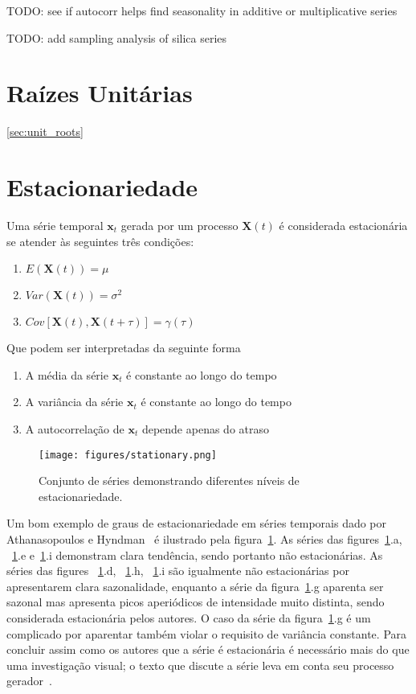 TODO: see if autocorr helps find seasonality in additive or multiplicative series

TODO: add sampling analysis of silica series


\section{Raízes Unitárias}\ref{sec:unit_roots}

\section{Estacionariedade}\label{sec:stationarity}

Uma série temporal $\mathbf{x}_t$ gerada por um processo $\mathbf{X}(t)$ é
considerada estacionária se atender às seguintes três condições:

\begin{enumerate}
    \item $E(\mathbf{X}(t)) = \mu$
    \item $Var(\mathbf{X}(t)) = \sigma^2$
    \item $Cov[\mathbf{X}(t), \mathbf{X}(t+\tau)] = \gamma(\tau)$
\end{enumerate}\vspace{.5cm}

Que podem ser interpretadas da seguinte forma

\begin{enumerate}
    \item A média da série $\mathbf{x}_t$ é constante ao longo do tempo
    \item A variância da série $\mathbf{x}_t$ é constante ao longo do tempo
    \item A autocorrelação de $\mathbf{x}_t$ depende apenas do atraso
\end{enumerate}\vspace{.5cm}

\begin{figure}[h]
    \centering
    \texttt{[image: figures/stationary.png]}
    \caption{Conjunto de séries demonstrando diferentes níveis de
    estacionariedade.}
    \label{fig:stationarity}
\end{figure}

Um bom exemplo de graus de estacionariedade em séries temporais dado por
Athanasopoulos e Hyndman~\cite{athana} é ilustrado pela
figura~\ref{fig:stationarity}. As séries das figures~\ref{fig:stationarity}.a,
~\ref{fig:stationarity}.e e~\ref{fig:stationarity}.i demonstram clara
tendência, sendo portanto não estacionárias. As séries das figures
~\ref{fig:stationarity}.d, ~\ref{fig:stationarity}.h, ~\ref{fig:stationarity}.i
são igualmente não estacionárias por apresentarem clara sazonalidade, enquanto
a série da figura~\ref{fig:stationarity}.g aparenta ser sazonal mas apresenta
picos aperiódicos de intensidade muito distinta, sendo considerada estacionária
pelos autores. O caso da série da figura~\ref{fig:stationarity}.g é um
complicado por aparentar também violar o requisito de variância constante. Para
concluir assim como os autores que a série é estacionária é necessário mais do
que uma investigação visual; o texto que discute a série leva em conta seu
processo gerador~\cite{athana}.

